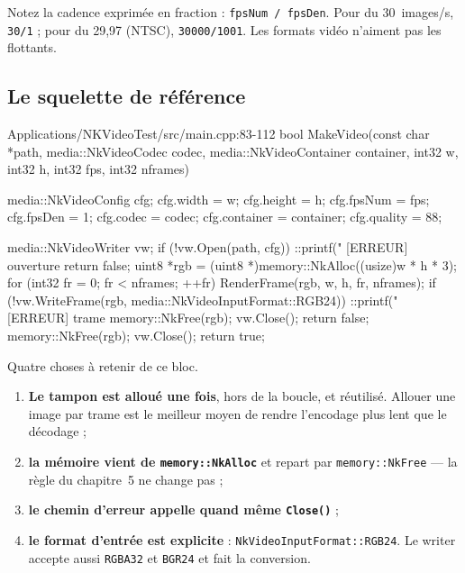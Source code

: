 Notez la cadence exprimée en fraction : \texttt{fpsNum / fpsDen}. Pour du
30~images/s, \texttt{30/1} ; pour du 29,97 (NTSC), \texttt{30000/1001}. Les
formats vidéo n'aiment pas les flottants.

\subsection{Le squelette de référence}

\begin{nkcode}{Applications/NKVideoTest/src/main.cpp:83-112}
    bool MakeVideo(const char *path, media::NkVideoCodec codec, media::NkVideoContainer container, int32 w, int32 h,
                   int32 fps, int32 nframes) {
        media::NkVideoConfig cfg;
        cfg.width = w;
        cfg.height = h;
        cfg.fpsNum = fps;
        cfg.fpsDen = 1;
        cfg.codec = codec;
        cfg.container = container;
        cfg.quality = 88;

        media::NkVideoWriter vw;
        if (!vw.Open(path, cfg)) {
            ::printf("  [ERREUR] ouverture %
            return false;
        }
        uint8 *rgb = (uint8 *)memory::NkAlloc((usize)w * h * 3);
        for (int32 fr = 0; fr < nframes; ++fr) {
            RenderFrame(rgb, w, h, fr, nframes);
            if (!vw.WriteFrame(rgb, media::NkVideoInputFormat::RGB24)) {
                ::printf("  [ERREUR] trame %
                memory::NkFree(rgb);
                vw.Close();
                return false;
            }
        }
        memory::NkFree(rgb);
        vw.Close();
        return true;
    }
\end{nkcode}

Quatre choses à retenir de ce bloc.

\begin{enumerate}
  \item \textbf{Le tampon est alloué une fois}, hors de la boucle, et réutilisé.
        Allouer une image par trame est le meilleur moyen de rendre l'encodage
        plus lent que le décodage ;
  \item \textbf{la mémoire vient de \texttt{memory::NkAlloc}} et repart par
        \texttt{memory::NkFree} — la règle du chapitre~5 ne change pas ;
  \item \textbf{le chemin d'erreur appelle quand même \texttt{Close()}} ;
  \item \textbf{le format d'entrée est explicite} :
        \texttt{NkVideoInputFormat::RGB24}. Le writer accepte aussi
        \texttt{RGBA32} et \texttt{BGR24} et fait la conversion.
\end{enumerate}

